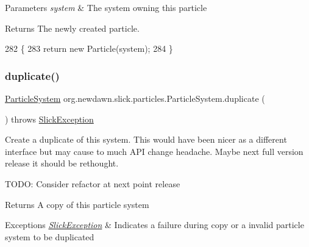 \begin{DoxyParams}{Parameters}
{\em system} & The system owning this particle \\
\hline
\end{DoxyParams}
\begin{DoxyReturn}{Returns}
The newly created particle. 
\end{DoxyReturn}

\begin{DoxyCode}
282                                                              \{
283         \textcolor{keywordflow}{return} \textcolor{keyword}{new} Particle(system);
284     \}
\end{DoxyCode}
\mbox{\label{classorg_1_1newdawn_1_1slick_1_1particles_1_1_particle_system_acd15fc1179567d3d539b74827cb2bcef}} 
\subsubsection{\texorpdfstring{duplicate()}{duplicate()}}
{\footnotesize\ttfamily \mbox{\hyperlink{classorg_1_1newdawn_1_1slick_1_1particles_1_1_particle_system}{Particle\+System}} org.\+newdawn.\+slick.\+particles.\+Particle\+System.\+duplicate (\begin{DoxyParamCaption}{ }\end{DoxyParamCaption}) throws \mbox{\hyperlink{classorg_1_1newdawn_1_1slick_1_1_slick_exception}{Slick\+Exception}}\hspace{0.3cm}{\ttfamily [inline]}}

Create a duplicate of this system. This would have been nicer as a different interface but may cause to much A\+PI change headache. Maybe next full version release it should be rethought.

T\+O\+DO\+: Consider refactor at next point release

\begin{DoxyReturn}{Returns}
A copy of this particle system 
\end{DoxyReturn}

\begin{DoxyExceptions}{Exceptions}
{\em \mbox{\hyperlink{classorg_1_1newdawn_1_1slick_1_1_slick_exception}{Slick\+Exception}}} & Indicates a failure during copy or a invalid particle system to be duplicated \\
\hline
\end{DoxyExceptions}

